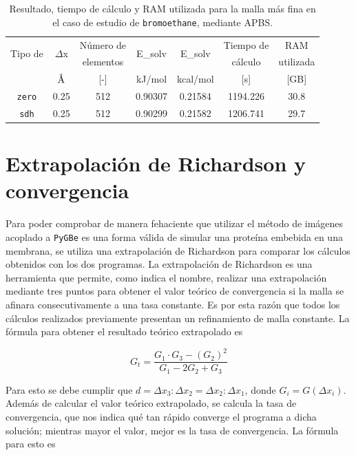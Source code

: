 \documentclass[12pt, twoside, onehalfspace, numbers, spanish]{ezthesis}
\numberwithin{equation}{section}
\newcommand{\angstrom}{\text{\normalfont\AA}}
\begin{document}
\begin{table}[h]
	\centering
	\caption{Resultado, tiempo de cálculo y RAM utilizada para la malla más fina en el caso de estudio de \texttt{bromoethane}, mediante APBS.}
	\def\arraystretch{1.2}
	\begin{tabular}{|c|cccccc|}\hline
		\multirow{2}{*}{Tipo de} & \multirow{2}{*}{$\Delta$x} & Número de & \multirow{2}{*}{E\_solv} & \multirow{2}{*}{E\_solv} & Tiempo de & RAM\\
		\multirow{2}{*}{condición} &  & elementos &  &  & cálculo & utilizada\\\cline{2-7}
		&  $\angstrom$ & [-] & kJ/mol & kcal/mol & [s] & [GB] \\\hline
	\texttt{zero} & 0.25 & 512 & 0.90307 & 0.21584 & 1194.226 & 30.8 \\
	\texttt{sdh} & 0.25 & 512 & 0.90299 & 0.21582 & 1206.741 & 29.7 \\ \hline
	\end{tabular}\label{table:apbs_brom}
\end{table}

\section{Extrapolación de Richardson y convergencia}
Para poder comprobar de manera fehaciente que utilizar el método de imágenes acoplado a \texttt{PyGBe} es una forma válida de simular una proteína embebida en una membrana, se utiliza una extrapolación de Richardson para comparar los cálculos obtenidos con los dos programas. La extrapolación de Richardson es una herramienta que permite, como indica el nombre, realizar una extrapolación mediante tres puntos para obtener el valor teórico de convergencia si la malla se afinara consecutivamente a una tasa constante. Es por esta razón que todos los cálculos realizados previamente presentan un refinamiento de malla constante. La fórmula para obtener el resultado teórico extrapolado es

\begin{equation}\label{eqn:Richardson_ext}
G_t = \frac{G_1\cdot G_3 - (G_2)^2}{G_1 - 2G_2 + G_3}
\end{equation}

\noindent
Para esto se debe cumplir que $d = \Delta x_3:\Delta x_2 = \Delta x_2:\Delta x_1$, donde $G_i = G(\Delta x_i)$. Además de calcular el valor teórico extrapolado, se calcula la tasa de convergencia, que nos indica qué tan rápido converge el programa a dicha solución; mientras mayor el valor, mejor es la tasa de convergencia. La fórmula para esto es
\end{document}

